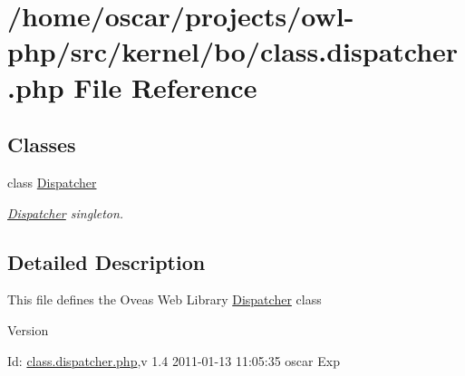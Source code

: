 \section{/home/oscar/projects/owl-\/php/src/kernel/bo/class.dispatcher.php File Reference}
\label{class_8dispatcher_8php}
\subsection*{Classes}
\begin{DoxyCompactItemize}
\item 
class \hyperlink{classDispatcher}{Dispatcher}
\begin{DoxyCompactList}\small\item\em \hyperlink{classDispatcher}{Dispatcher} singleton. \item\end{DoxyCompactList}\end{DoxyCompactItemize}


\subsection{Detailed Description}
This file defines the Oveas Web Library \hyperlink{classDispatcher}{Dispatcher} class \begin{DoxyVersion}{Version}

\end{DoxyVersion}
\begin{DoxyParagraph}{Id:}
\hyperlink{class_8dispatcher_8php}{class.dispatcher.php},v 1.4 2011-\/01-\/13 11:05:35 oscar Exp 
\end{DoxyParagraph}
